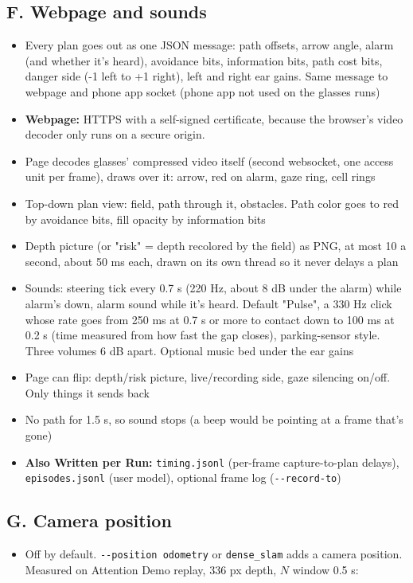 \documentclass[a4paper]{article}
\begin{document}
\subsection{F. Webpage and sounds} \label{f-webpage-and-sounds}
\begin{itemize}
	\item Every plan goes out as one JSON message: path offsets, arrow angle, alarm (and whether it's heard), avoidance bits, information bits, path cost bits, danger side (-1 left to +1 right), left and right ear gains. Same message to webpage and phone app socket (phone app not used on the glasses runs)
	\item \textbf{Webpage:} HTTPS with a self-signed certificate, because the browser's video decoder only runs on a secure origin.  
	\item Page decodes glasses' compressed video itself (second websocket, one access unit per frame), draws over it: arrow, red on alarm, gaze ring, cell rings  
	\item Top-down plan view: field, path through it, obstacles. Path color goes to red by avoidance bits, fill opacity by information bits  
	\item Depth picture (or "risk" = depth recolored by the field) as PNG, at most 10 a second, about 50 ms each, drawn on its own thread so it never delays a plan  
	\item Sounds: steering tick every 0.7 s (220 Hz, about 8 dB under the alarm) while alarm's down, alarm sound while it's heard. Default "Pulse", a 330 Hz click whose rate goes from 250 ms at 0.7 s or more to contact down to 100 ms at 0.2 s (time measured from how fast the gap closes), parking-sensor style. Three volumes 6 dB apart. Optional music bed under the ear gains  
	\item Page can flip: depth/risk picture, live/recording side, gaze silencing on/off. Only things it sends back  
	\item No path for 1.5 s, so sound stops (a beep would be pointing at a frame that's gone)
	\item \textbf{Also Written per Run:} \verb`timing.jsonl` (per-frame capture-to-plan delays), \verb`episodes.jsonl` (user model), optional frame log (\verb`--record-to`)
\end{itemize}

\subsection{G. Camera position} \label{g-camera-position}
\begin{itemize}
	\item Off by default. \verb`--position odometry` or \verb`dense_slam` adds a camera position. Measured on Attention Demo replay, 336 px depth, $N$ window 0.5 s:
\end{itemize}
\end{document}

